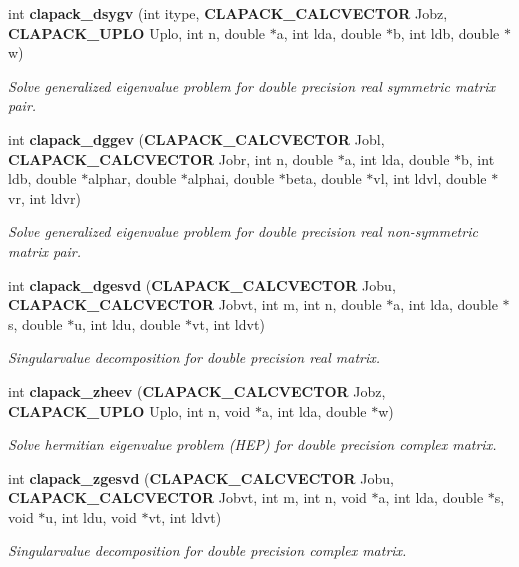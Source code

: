 \begin{DoxyCompactItemize}
int {\bf clapack\-\_\-dsygv} (int itype, {\bf C\-L\-A\-P\-A\-C\-K\-\_\-\-C\-A\-L\-C\-V\-E\-C\-T\-O\-R} Jobz, {\bf C\-L\-A\-P\-A\-C\-K\-\_\-\-U\-P\-L\-O} Uplo, int n, double $\ast$a, int lda, double $\ast$b, int ldb, double $\ast$w)
\begin{DoxyCompactList}\small\item\em Solve generalized eigenvalue problem for double precision real symmetric matrix pair. \end{DoxyCompactList}\item 
int {\bf clapack\-\_\-dggev} ({\bf C\-L\-A\-P\-A\-C\-K\-\_\-\-C\-A\-L\-C\-V\-E\-C\-T\-O\-R} Jobl, {\bf C\-L\-A\-P\-A\-C\-K\-\_\-\-C\-A\-L\-C\-V\-E\-C\-T\-O\-R} Jobr, int n, double $\ast$a, int lda, double $\ast$b, int ldb, double $\ast$alphar, double $\ast$alphai, double $\ast$beta, double $\ast$vl, int ldvl, double $\ast$vr, int ldvr)
\begin{DoxyCompactList}\small\item\em Solve generalized eigenvalue problem for double precision real non-\/symmetric matrix pair. \end{DoxyCompactList}\item 
int {\bf clapack\-\_\-dgesvd} ({\bf C\-L\-A\-P\-A\-C\-K\-\_\-\-C\-A\-L\-C\-V\-E\-C\-T\-O\-R} Jobu, {\bf C\-L\-A\-P\-A\-C\-K\-\_\-\-C\-A\-L\-C\-V\-E\-C\-T\-O\-R} Jobvt, int m, int n, double $\ast$a, int lda, double $\ast$s, double $\ast$u, int ldu, double $\ast$vt, int ldvt)
\begin{DoxyCompactList}\small\item\em Singularvalue decomposition for double precision real matrix. \end{DoxyCompactList}\item 
int {\bf clapack\-\_\-zheev} ({\bf C\-L\-A\-P\-A\-C\-K\-\_\-\-C\-A\-L\-C\-V\-E\-C\-T\-O\-R} Jobz, {\bf C\-L\-A\-P\-A\-C\-K\-\_\-\-U\-P\-L\-O} Uplo, int n, void $\ast$a, int lda, double $\ast$w)
\begin{DoxyCompactList}\small\item\em Solve hermitian eigenvalue problem (H\-E\-P) for double precision complex matrix. \end{DoxyCompactList}\item 
int {\bf clapack\-\_\-zgesvd} ({\bf C\-L\-A\-P\-A\-C\-K\-\_\-\-C\-A\-L\-C\-V\-E\-C\-T\-O\-R} Jobu, {\bf C\-L\-A\-P\-A\-C\-K\-\_\-\-C\-A\-L\-C\-V\-E\-C\-T\-O\-R} Jobvt, int m, int n, void $\ast$a, int lda, double $\ast$s, void $\ast$u, int ldu, void $\ast$vt, int ldvt)
\begin{DoxyCompactList}\small\item\em Singularvalue decomposition for double precision complex matrix. \end{DoxyCompactList}\end{DoxyCompactItemize}


